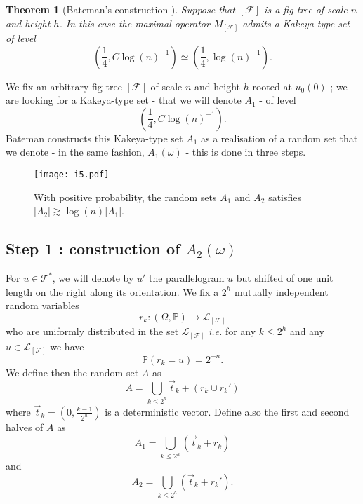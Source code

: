 \documentclass{article}
\newtheorem{thm}{Theorem}
\begin{document}
\begin{thm}[Bateman's construction \cite{BATEMAN}]\label{ T : main thm bateman }
Suppose that $[\mathcal{F}]$ is a fig tree of scale $n$ and height $h$. In this case the maximal operator $M_{[\mathcal{F}]}$ admits a Kakeya-type set of level $$\left(\frac{1}{4}, C \log(n)^{-1}\right) \simeq \left(\frac{1}{4},\log(n)^{-1}\right).$$
\end{thm}

We fix an arbitrary fig tree $[\mathcal{F}]$ of scale $n$ and height $h$ rooted at $u_0(0)$ ; we are looking for a Kakeya-type set - that we will denote $A_1$ - of level $$\left(\frac{1}{4}, C \log(n)^{-1}\right).$$ Bateman constructs this Kakeya-type set $A_1$ as a realisation of a random set that we denote - in the same fashion, $A_1(\omega)$ - this is done in three steps.



\begin{figure}[h!]
\centering
\texttt{[image: i5.pdf]}
\caption{With positive probability, the random sets $A_1$ and $A_2$ satisfies $|A_2| \gtrsim \log(n) |A_1|$. }  
\end{figure}



\subsection*{Step 1 : construction of $A_2(\omega)$}

For $u \in \mathcal{T}^*$, we will denote by $u'$ the parallelogram $u$ but shifted of one unit length on the right along its orientation. We fix a $2^h$ mutually independent random variables $$ r_k : (\Omega,\mathbb{P}) \rightarrow \mathcal{L}_{[\mathcal{F}]}$$ who are uniformly distributed in the set $\mathcal{L}_{[\mathcal{F}]}$ \textit{i.e.} for any $k \leq 2^h$ and any $u \in \mathcal{L}_{[\mathcal{F}]}$ we have $$\mathbb{P}(r_k = u) = 2^{-n}.$$ We define then the random set $A$ as $$A = \bigcup_{ k \leq 2^h} \Vec{t}_k + \left( r_k \cup r_k' \right) $$ where $\Vec{t}_k = (0,\frac{k-1}{2^h})$ is a deterministic vector. Define also the first and second halves of $A$ as $$A_1 = \bigcup_{ k \leq 2^h}  \left( \Vec{t}_k + r_k \right) $$ and $$ A_2 = \bigcup_{ k \leq 2^h} \left( \Vec{t}_k + r_k' \right) .$$ 
\end{document}
